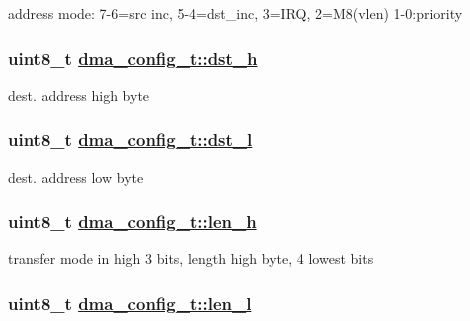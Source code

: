 address mode: 7-6=src inc, 5-4=dst\_\-inc, 3=IRQ, 2=M8(vlen) 1-0:priority \hypertarget{structdma__config__t_528a6d47caadb8b50b6bfa73444fb711}{
\subsubsection[dst\_\-h]{\setlength{\rightskip}{0pt plus 5cm}uint8\_\-t \hyperlink{structdma__config__t_528a6d47caadb8b50b6bfa73444fb711}{dma\_\-config\_\-t::dst\_\-h}}}
\label{structdma__config__t_528a6d47caadb8b50b6bfa73444fb711}


dest. address high byte \hypertarget{structdma__config__t_ba26fe8bc8fc23929a766db7afe2e082}{
\subsubsection[dst\_\-l]{\setlength{\rightskip}{0pt plus 5cm}uint8\_\-t \hyperlink{structdma__config__t_ba26fe8bc8fc23929a766db7afe2e082}{dma\_\-config\_\-t::dst\_\-l}}}
\label{structdma__config__t_ba26fe8bc8fc23929a766db7afe2e082}


dest. address low byte \hypertarget{structdma__config__t_c28c429f8e8b40eb50daf4994ecdf056}{
\subsubsection[len\_\-h]{\setlength{\rightskip}{0pt plus 5cm}uint8\_\-t \hyperlink{structdma__config__t_c28c429f8e8b40eb50daf4994ecdf056}{dma\_\-config\_\-t::len\_\-h}}}
\label{structdma__config__t_c28c429f8e8b40eb50daf4994ecdf056}


transfer mode in high 3 bits, length high byte, 4 lowest bits \hypertarget{structdma__config__t_a4bfe298c22cedde28a40bd00d1db608}{
\subsubsection[len\_\-l]{\setlength{\rightskip}{0pt plus 5cm}uint8\_\-t \hyperlink{structdma__config__t_a4bfe298c22cedde28a40bd00d1db608}{dma\_\-config\_\-t::len\_\-l}}}
\label{structdma__config__t_a4bfe298c22cedde28a40bd00d1db608}


